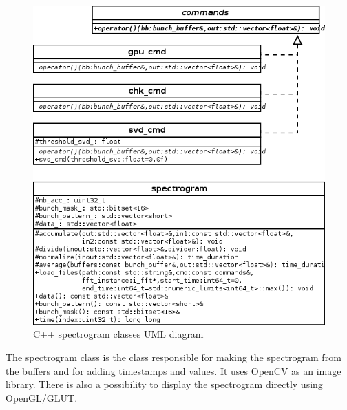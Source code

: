 \begin{figure}[H]
\centering
\label{fig:spectrogram_uml}
\caption{C++ spectrogram classes UML diagram}
\includegraphics[scale=0.5]{spectrogram_uml.png}
\end{figure}

The spectrogram class is the class responsible for making the spectrogram from the buffers and for adding timestamps and values. It uses \gls{OpenCV} as an image library. There is also a possibility to display the spectrogram directly using \gls{OpenGL}/GLUT.


